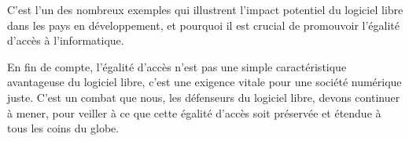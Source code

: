 C'est l'un des nombreux exemples qui illustrent l'impact potentiel du logiciel libre dans les pays en développement, et pourquoi il est crucial de promouvoir l'égalité d'accès à l'informatique.
\cite{openedition}

En fin de compte, l'égalité d'accès n'est pas une simple caractéristique avantageuse du logiciel libre, c'est une exigence vitale pour une société numérique juste. C'est un combat que nous, les défenseurs du logiciel libre, devons continuer à mener, pour veiller à ce que cette égalité d'accès soit préservée et étendue à tous les coins du globe.





